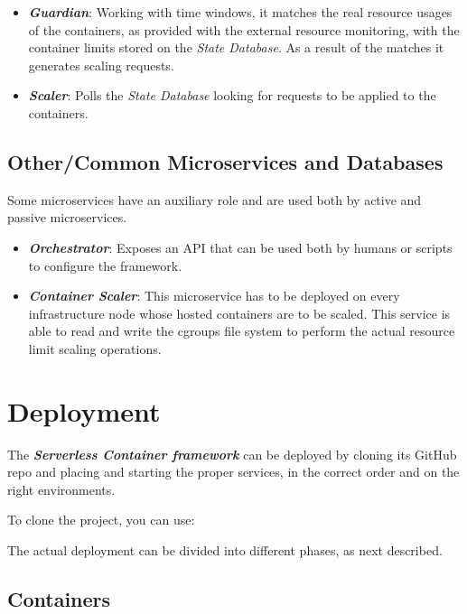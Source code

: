 \documentclass[12pt]{article}
\begin{document}
\begin{itemize}
	\item \textit{\textbf{Guardian}}: Working with time windows, it matches the real resource usages of the containers, as provided with the external resource monitoring, with the container limits stored on the \textit{State Database}. As a result of the matches it generates scaling requests.
	\item \textit{\textbf{Scaler}}: Polls the \textit{State Database} looking for requests to be applied to the containers.
\end{itemize}

\subsection{Other/Common Microservices and Databases}

Some microservices have an auxiliary role and are used both by active and passive microservices.
\begin{itemize}
	\item \textit{\textbf{Orchestrator}}: Exposes an API that can be used both by humans or scripts to configure the framework.
	\item \textit{\textbf{Container Scaler}}: This microservice has to be deployed on every infrastructure node whose hosted containers are to be scaled. This service is able to read and write the cgroups file system to perform the actual resource limit scaling operations.	
\end{itemize}


\section{Deployment}
\label{sec:Deployment}

The \textbf{\textit{Serverless Container framework}} can be deployed by cloning its GitHub repo and placing and starting the proper services, in the correct order and on the right environments.

To clone the project, you can use: \newline

\noindent {} \newline

The actual deployment can be divided into different phases, as next described.

\subsection{Containers}
\end{document}

